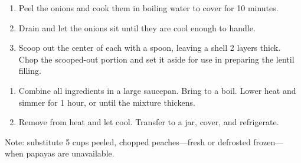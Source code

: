 


\begin{ingredients}
\end{ingredients}


\begin{recipe}
  \begin{enumerate}
  \item Peel the onions and cook them in boiling water to
    cover for 10 minutes.

  \item Drain and let the onions
    sit until they are cool enough to handle.

  \item Scoop
    out the center of each with a spoon, leaving a
    shell 2 layers thick.  Chop the scooped-out
    portion and set it aside for use in preparing the
    lentil filling.

  \end{enumerate}
\end{recipe}



\begin{ingredients}
\end{ingredients}

\begin{recipe}
  \begin{enumerate}

  \item Combine all ingredients in a large saucepan.
    Bring to a boil.  Lower heat and simmer for 1
    hour, or until the mixture thickens.

\item Remove from heat and let cool.  Transfer to a jar, cover, and
  refrigerate.

  \end{enumerate}
  
  Note: substitute 5 cups peeled, chopped peaches---fresh or defrosted
  frozen---when papayas are unavailable.

\end{recipe}


